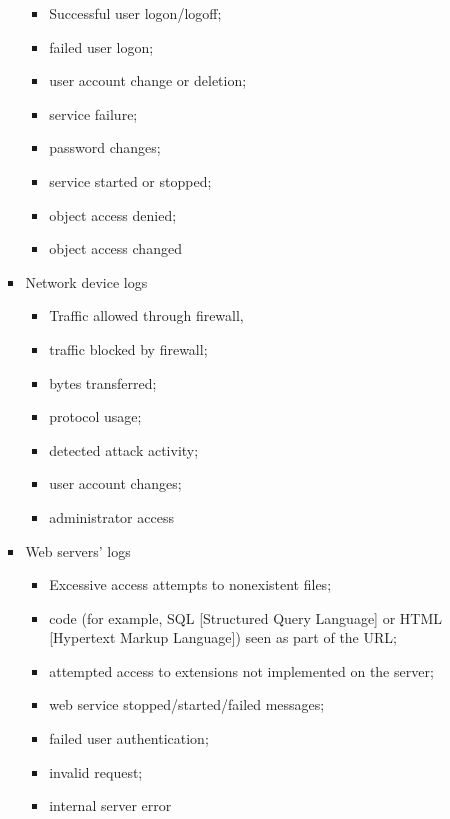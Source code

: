 \documentclass{article}
\begin{document}
\begin{itemize}
\begin{itemize}
\begin{itemize}
            \begin{itemize}
                \item Successful user logon/logoff; 
                \item failed user logon; 
                \item user account change or deletion; 
                \item service failure; 
                \item password changes; 
                \item service started or stopped; 
                \item object access denied; 
                \item object access changed
            \end{itemize}           
            \item Network device logs
            \begin{itemize}
                \item Traffic allowed through firewall, 
                \item traffic blocked by firewall; 
                \item bytes transferred; 
                \item protocol usage; 
                \item detected attack activity; 
                \item user account changes; 
                \item administrator access
            \end{itemize}
            \item Web servers' logs
            \begin{itemize}
                \item Excessive access attempts to nonexistent files; 
                \item code (for example, SQL [Structured Query Language] or HTML [Hypertext Markup Language]) seen as part of the URL; 
                \item attempted access to extensions not implemented on the server; 
                \item web service stopped/started/failed messages; 
                \item failed user authentication; 
                \item invalid request; 
                \item internal server error
            \end{itemize}

\end{itemize}
\end{itemize}
\end{itemize}
\end{document}
